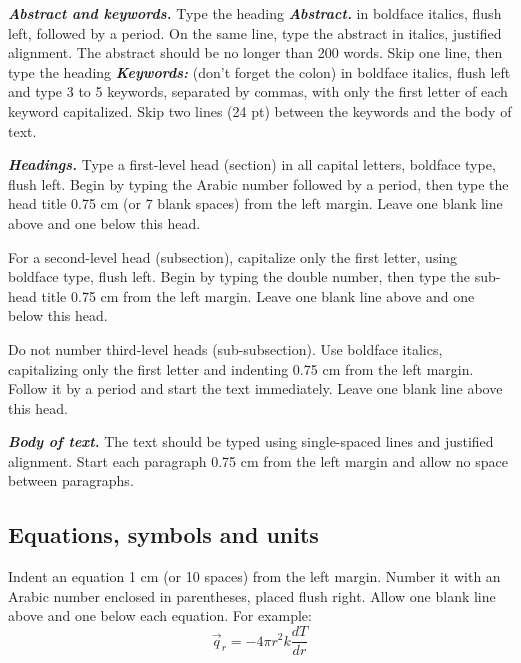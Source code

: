 \documentclass[12pt,fleqn]{article}
\begin{document}
\vspace{0.5cm} %

\textbf{\textit{Abstract and keywords.}} Type the heading \textbf{\textit{Abstract.}} in boldface italics, flush left, followed by a period. On the same line, type the abstract in italics, justified alignment. The abstract should be no longer than 200 words. Skip one line, then type the heading \textbf{\textit{Keywords:}} (don't forget the colon) in boldface italics, flush left and type 3 to 5 keywords, separated by commas, with only the first letter of each keyword capitalized. Skip two lines (24 pt) between the keywords and the body of text.

\vspace{0.5cm} %

\textbf{\textit{Headings.}} Type a first-level head (section) in all capital letters, boldface type, flush left. Begin by typing the Arabic number followed by a period, then type the head title 0.75 cm (or 7 blank spaces) from the left margin. Leave one blank line above and one below this head. 

For a second-level head (subsection), capitalize only the first letter, using boldface type, flush left. Begin by typing the double number, then type the sub-head title 0.75 cm from the left margin. Leave one blank line above and one below this head. 

Do not number third-level heads (sub-subsection). Use boldface italics, capitalizing only the first letter and indenting 0.75 cm from the left margin. Follow it by a period and start the text immediately. Leave one blank line above this head.

\vspace{0.5cm} %
% 
\textbf{\textit{Body of text.}} The text should be typed using single-spaced lines and justified alignment. Start each paragraph 0.75 cm from the left margin and allow no space between paragraphs.

\subsection{Equations, symbols and units}
Indent an equation 1 cm (or 10 spaces) from the left margin. Number it with an Arabic number enclosed in parentheses, placed flush right. Allow one blank line above and one below each equation. For example:
\begin{equation}
\vec{q}_{r}=-4\pi r^{2}k\frac{dT}{dr}
\label{eq1}
\end{equation}
\end{document}
